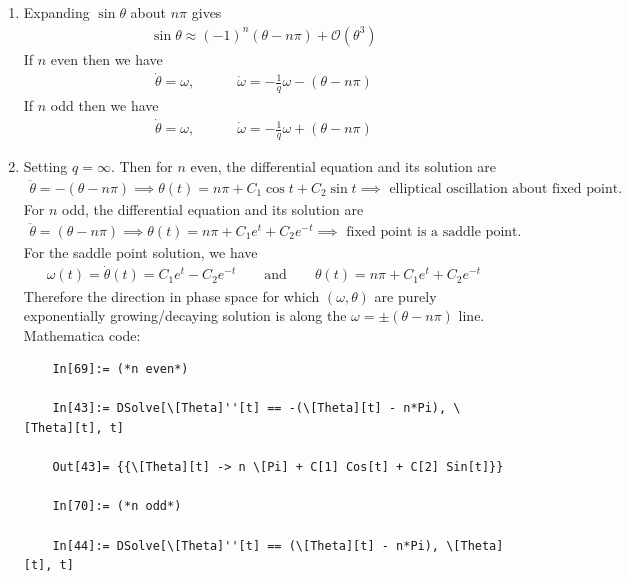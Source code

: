\documentclass{article}
\theoremstyle{definition}
\newcommand{\f}[2]{\frac{#1}{#2}}
\begin{document}
\begin{enumerate}[label=(\alph*)]
	\item Expanding $\sin\theta$ about $n\pi$ gives
	\begin{align*}
	\sin\theta \approx (-1)^n( \theta - n\pi) +  \mathcal{O}(\theta^3)
	\end{align*}
	If $n$ even then we have
	\begin{align*}
	\dot\theta = \omega, \quad\quad\quad \dot \omega = -\f{1}{q}\omega - ( \theta - n\pi)
	\end{align*}
	If $n$ odd then we have
	\begin{align*}
	\dot\theta = \omega, \quad\quad\quad \dot \omega = -\f{1}{q}\omega + ( \theta - n\pi)
	\end{align*}
	
	
	
	\item Setting $q=\infty$. Then for $n$ even, the differential equation and its solution are
	\begin{align*}
	\ddot\theta = -(\theta - n\pi) \implies \theta(t) = n\pi + C_1 \cos t + C_2 \sin t \implies \text{ elliptical oscillation about fixed point}.
	\end{align*}
	For $n$ odd, the differential equation and its solution are 
	\begin{align*}
	\ddot\theta = (\theta - n\pi) \implies \theta(t) = n\pi + C_1 e^t + C_2 e^{-t}  \implies \text{ fixed point is a saddle point}.
	\end{align*}
	For the saddle point solution, we have
	\begin{align*}
	\omega(t) = \dot\theta(t) = C_1 e^t - C_2 e^{-t}\quad\quad \text{and}\quad\quad \theta(t) = n\pi + C_1 e^t + C_2 e^{-t} 
	\end{align*}
	Therefore the direction in phase space for which $(\omega,\theta)$ are purely exponentially growing/decaying solution is along the $\omega= \pm(\theta - n\pi)$ line. \\
	
	
	Mathematica code:
	\begin{lstlisting}
	In[69]:= (*n even*)
	
	In[43]:= DSolve[\[Theta]''[t] == -(\[Theta][t] - n*Pi), \[Theta][t], t]
	
	Out[43]= {{\[Theta][t] -> n \[Pi] + C[1] Cos[t] + C[2] Sin[t]}}
	
	In[70]:= (*n odd*)
	
	In[44]:= DSolve[\[Theta]''[t] == (\[Theta][t] - n*Pi), \[Theta][t], t]
	

\end{lstlisting}
\end{enumerate}
\end{document}
